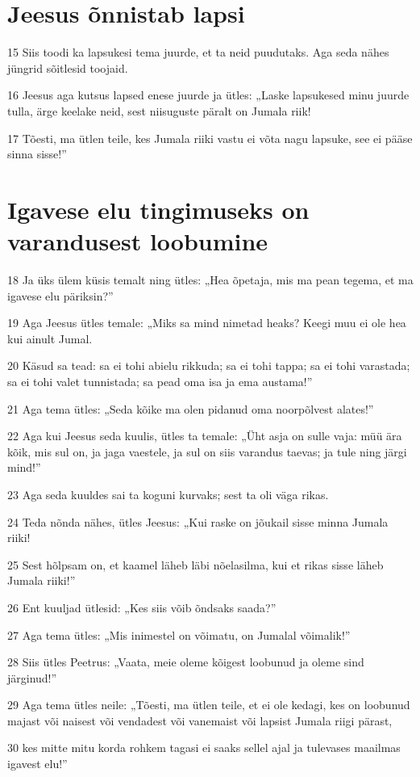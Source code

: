 \section*{Jeesus õnnistab lapsi}

\par 15 Siis toodi ka lapsukesi tema juurde, et ta neid puudutaks. Aga seda nähes jüngrid sõitlesid toojaid.
\par 16 Jeesus aga kutsus lapsed enese juurde ja ütles: „Laske lapsukesed minu juurde tulla, ärge keelake neid, sest niisuguste päralt on Jumala riik!
\par 17 Tõesti, ma ütlen teile, kes Jumala riiki vastu ei võta nagu lapsuke, see ei pääse sinna sisse!”

\section*{Igavese elu tingimuseks on varandusest loobumine}

\par 18 Ja üks ülem küsis temalt ning ütles: „Hea õpetaja, mis ma pean tegema, et ma igavese elu päriksin?”
\par 19 Aga Jeesus ütles temale: „Miks sa mind nimetad heaks? Keegi muu ei ole hea kui ainult Jumal.
\par 20 Käsud sa tead: sa ei tohi abielu rikkuda; sa ei tohi tappa; sa ei tohi varastada; sa ei tohi valet tunnistada; sa pead oma isa ja ema austama!”
\par 21 Aga tema ütles: „Seda kõike ma olen pidanud oma noorpõlvest alates!”
\par 22 Aga kui Jeesus seda kuulis, ütles ta temale: „Üht asja on sulle vaja: müü ära kõik, mis sul on, ja jaga vaestele, ja sul on siis varandus taevas; ja tule ning järgi mind!”
\par 23 Aga seda kuuldes sai ta koguni kurvaks; sest ta oli väga rikas.
\par 24 Teda nõnda nähes, ütles Jeesus: „Kui raske on jõukail sisse minna Jumala riiki!
\par 25 Sest hõlpsam on, et kaamel läheb läbi nõelasilma, kui et rikas sisse läheb Jumala riiki!”
\par 26 Ent kuuljad ütlesid: „Kes siis võib õndsaks saada?”
\par 27 Aga tema ütles: „Mis inimestel on võimatu, on Jumalal võimalik!”
\par 28 Siis ütles Peetrus: „Vaata, meie oleme kõigest loobunud ja oleme sind järginud!”
\par 29 Aga tema ütles neile: „Tõesti, ma ütlen teile, et ei ole kedagi, kes on loobunud majast või naisest või vendadest või vanemaist või lapsist Jumala riigi pärast,
\par 30 kes mitte mitu korda rohkem tagasi ei saaks sellel ajal ja tulevases maailmas igavest elu!”

